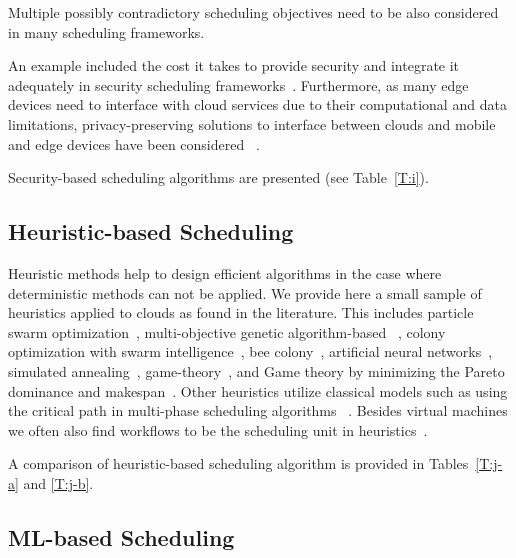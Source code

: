 \documentclass[final,5p,times,twocolumn]{elsarticle}
\begin{document}
Multiple possibly contradictory scheduling objectives need to be also considered in many scheduling frameworks.

An example included the cost it takes to provide security and integrate it adequately in security scheduling frameworks~\cite{kashyap2014security,zeng2015saba,wang2012cloud}. Furthermore, as many edge devices need to interface with cloud services due to their computational and data limitations, privacy-preserving solutions to interface between clouds and mobile and edge devices have been considered ~\cite{bilogrevic2011meetings}.

Security-based scheduling algorithms are presented (see Table~\ref{T:i}).



%

\subsection{Heuristic-based Scheduling}\label{sec:heuristic}


Heuristic methods help to design efficient algorithms in the case where deterministic methods can not be applied. We provide here a small sample of heuristics applied to clouds as found in the literature. This includes particle swarm optimization~\cite{pandey2010particle}, multi-objective genetic algorithm-based ~\cite{mezmaz2011parallel,gkasior2016metaheuristic}, colony optimization with swarm intelligence~\cite{mateos2013aco}, bee colony~\cite{ld2013honey}, artificial neural networks~\cite{kousiouris2011effects}, simulated annealing~\cite{torabzadeh2010cloud}, game-theory~\cite{gkasior2016metaheuristic}, and Game theory by minimizing the Pareto dominance and makespan~\cite{su2013cost}. Other heuristics utilize classical models such as using the critical path in multi-phase scheduling algorithms ~\cite {abrishami2013deadline}. Besides virtual machines we often also find workflows to be the scheduling unit in heuristics~\cite{bousselmi2016qos}.

A comparison of heuristic-based scheduling algorithm is provided in
Tables~\ref{T:j-a} and \ref{T:j-b}.

%


\subsection{ML-based Scheduling}\label{sec:AI}
\end{document}
